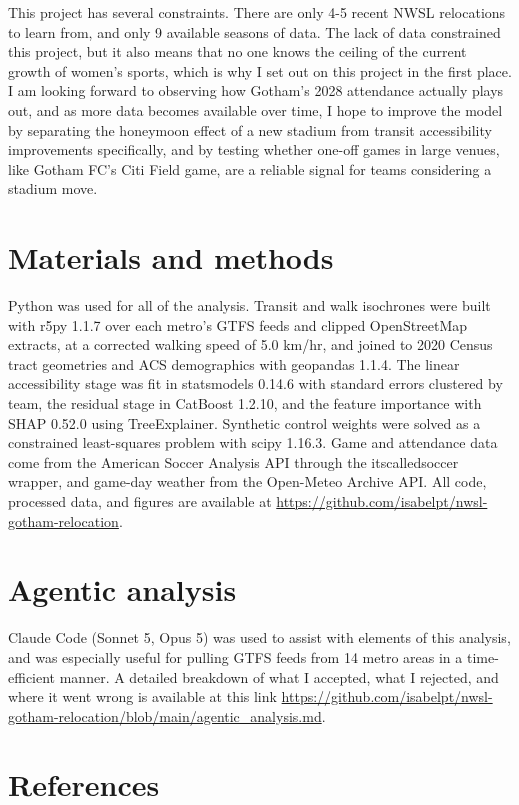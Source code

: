 \documentclass[9pt,twoside]{pnas-new}
\begin{document}
This project has several constraints. There are only 4-5 recent NWSL relocations to learn from, and only 9 available seasons of data. The lack of data constrained this project, but it also means that no one knows the ceiling of the current growth of women's sports, which is why I set out on this project in the first place. I am looking forward to observing how Gotham's 2028 attendance actually plays out, and as more data becomes available over time, I hope to improve the model by separating the honeymoon effect of a new stadium from transit accessibility improvements specifically, and by testing whether one-off games in large venues, like Gotham FC's Citi Field game, are a reliable signal for teams considering a stadium move.

\section{Materials and methods}
Python was used for all of the analysis. Transit and walk isochrones were built with r5py 1.1.7 over each metro's GTFS feeds and clipped OpenStreetMap extracts, at a corrected walking speed of 5.0 km/hr, and joined to 2020 Census tract geometries and ACS demographics with geopandas 1.1.4. The linear accessibility stage was fit in statsmodels 0.14.6 with standard errors clustered by team, the residual stage in CatBoost 1.2.10, and the feature importance with SHAP 0.52.0 using TreeExplainer. Synthetic control weights were solved as a constrained least-squares problem with scipy 1.16.3. Game and attendance data come from the American Soccer Analysis API through the itscalledsoccer wrapper, and game-day weather from the Open-Meteo Archive API. All code, processed data, and figures are available at \url{https://github.com/isabelpt/nwsl-gotham-relocation}.

\section{Agentic analysis} Claude Code (Sonnet 5, Opus 5) was used to assist with elements of this analysis, and was especially useful for pulling GTFS feeds from 14 metro areas in a time-efficient manner. A detailed breakdown of what I accepted, what I rejected, and where it went wrong is available at this link \url{https://github.com/isabelpt/nwsl-gotham-relocation/blob/main/agentic_analysis.md}.


\section{References}



\showacknow %

\end{document}
